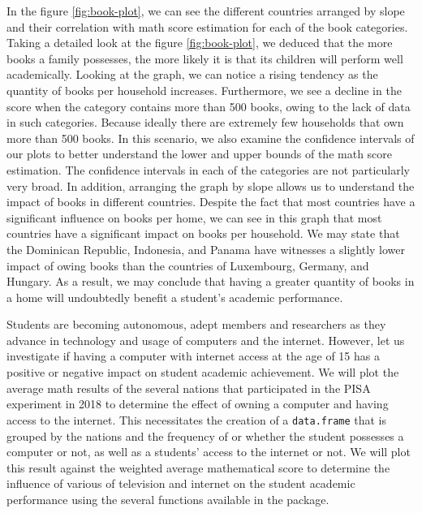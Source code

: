 In the figure \ref{fig:book-plot}, we can see the different countries
arranged by slope and their correlation with math score estimation for
each of the book categories. Taking a detailed look at the figure
\ref{fig:book-plot}, we deduced that the more books a family possesses,
the more likely it is that its children will perform well academically.
Looking at the graph, we can notice a rising tendency as the quantity of
books per household increases. Furthermore, we see a decline in the
score when the category contains more than 500 books, owing to the lack
of data in such categories. Because ideally there are extremely few
households that own more than 500 books. In this scenario, we also
examine the confidence intervals of our plots to better understand the
lower and upper bounds of the math score estimation. The confidence
intervals in each of the categories are not particularly very broad. In
addition, arranging the graph by slope allows us to understand the
impact of books in different countries. Despite the fact that most
countries have a significant influence on books per home, we can see in
this graph that most countries have a significant impact on books per
household. We may state that the Dominican Republic, Indonesia, and
Panama have witnesses a slightly lower impact of owing books than the
countries of Luxembourg, Germany, and Hungary. As a result, we may
conclude that having a greater quantity of books in a home will
undoubtedly benefit a student's academic performance.

Students are becoming autonomous, adept members and researchers as they
advance in technology and usage of computers and the internet. However,
let us investigate if having a computer with internet access at the age
of 15 has a positive or negative impact on student academic achievement.
We will plot the average math results of the several nations that
participated in the PISA experiment in 2018 to determine the effect of
owning a computer and having access to the internet. This necessitates
the creation of a \texttt{data.frame} that is grouped by the nations and
the frequency of or whether the student possesses a computer or not, as
well as a students' access to the internet or not. We will plot this
result against the weighted average mathematical score to determine the
influence of various of television and internet on the student academic
performance using the several functions available in the
 \citep{ggplot2} package.

